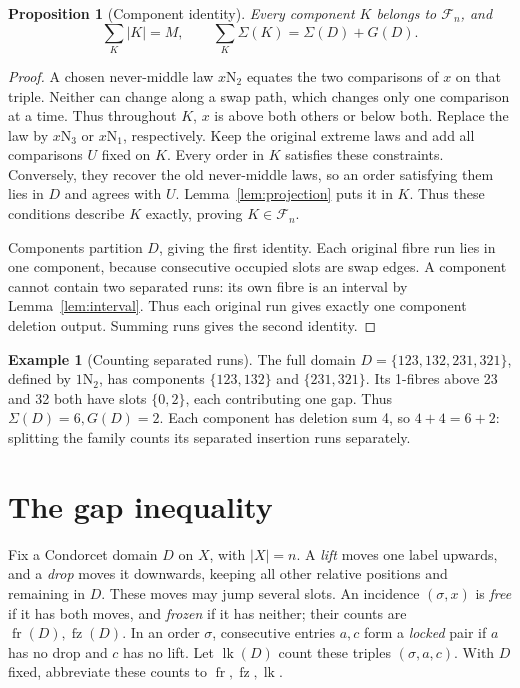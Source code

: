 \documentclass[11pt,letterpaper]{article}
\newtheorem{proposition}[theorem]{Proposition}
\theoremstyle{definition}
\newtheorem{example}[theorem]{Example}
\newcommand{\F}{\mathcal F}
\newcommand{\Sig}{\Sigma}
\newcommand{\fr}{\operatorname{fr}}
\newcommand{\fz}{\operatorname{fz}}
\newcommand{\lk}{\operatorname{lk}}
\newcommand{\N}[2]{#1\mathrm N_{#2}}
\begin{document}
\begin{proposition}[Component identity]\label{prop:components}
Every component \(K\) belongs to \(\F_n\), and
\begin{equation}\label{eq:components}
 \sum_K |K|=M,\qquad \sum_K\Sig(K)=\Sig(D)+G(D).
\end{equation}
\end{proposition}
\begin{proof}
A chosen never-middle law \(\N x2\) equates the two comparisons of
\(x\) on that triple. Neither can change along a swap path, which
changes only one comparison at a time. Thus throughout \(K\), \(x\)
is above both others or below both. Replace the law by \(\N x3\)
or \(\N x1\), respectively. Keep the original extreme laws and add
all comparisons \(U\) fixed on \(K\). Every order in \(K\) satisfies
these constraints. Conversely, they recover the old never-middle laws,
so an order satisfying them lies in \(D\) and agrees with \(U\).
Lemma~\ref{lem:projection} puts it in \(K\). Thus these conditions
describe \(K\) exactly, proving \(K\in\F_n\).

Components partition \(D\), giving the first identity. Each original
fibre run lies in one component, because consecutive occupied slots
are swap edges. A component cannot contain two separated runs: its
own fibre is an interval by Lemma~\ref{lem:interval}. Thus each original
run gives exactly one component deletion output. Summing runs gives
the second identity.
\end{proof}

\begin{example}[Counting separated runs]\label{ex:gap}
The full domain \(D=\{123,132,231,321\}\), defined by \(\N12\),
has components \(\{123,132\}\) and \(\{231,321\}\).
Its 1-fibres above 23 and 32 both have slots \(\{0,2\}\), each
contributing one gap. Thus \(\Sig(D)=6,G(D)=2\). Each component
has deletion sum 4, so \(4+4=6+2\): splitting the family counts
its separated insertion runs separately.
\end{example}

\clearpage
\section{The gap inequality}\label{sec:gap}
Fix a Condorcet domain \(D\) on \(X\), with \(|X|=n\).
A \emph{lift} moves one label upwards, and a \emph{drop} moves it
downwards, keeping all other relative positions and remaining in \(D\).
These moves may jump several slots. An incidence \((\sigma,x)\) is
\emph{free} if it has both moves, and \emph{frozen} if it has neither;
their counts are \(\fr(D),\fz(D)\). In an order \(\sigma\), consecutive
entries \(a,c\) form a \emph{locked} pair if \(a\) has no drop and
\(c\) has no lift. Let \(\lk(D)\) count these triples \( (\sigma,a,c)\). With \(D\) fixed, abbreviate these
counts to \(\fr,\fz,\lk\).
\end{document}
